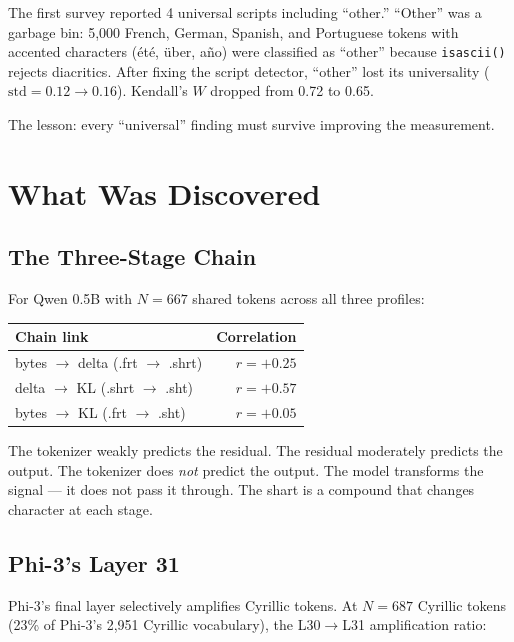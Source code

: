 \documentclass[11pt,a4paper]{article}
\begin{document}
The first survey reported 4 universal scripts including ``other.'' ``Other'' was a garbage bin: 5{,}000 French, German, Spanish, and Portuguese tokens with accented characters (\'et\'e, \"uber, a\~no) were classified as ``other'' because \texttt{isascii()} rejects diacritics. After fixing the script detector, ``other'' lost its universality ($\text{std} = 0.12 \to 0.16$). Kendall's $W$ dropped from 0.72 to 0.65.

The lesson: every ``universal'' finding must survive improving the measurement.

\section{What Was Discovered}

\subsection{The Three-Stage Chain}

For Qwen 0.5B with $N = 667$ shared tokens across all three profiles:

\begin{center}
\begin{tabular}{lr}
\toprule
\textbf{Chain link} & \textbf{Correlation} \\
\midrule
bytes $\to$ delta (.frt $\to$ .shrt) & $r = +0.25$ \\
delta $\to$ KL (.shrt $\to$ .sht) & $r = +0.57$ \\
bytes $\to$ KL (.frt $\to$ .sht) & $r = +0.05$ \\
\bottomrule
\end{tabular}
\end{center}

The tokenizer weakly predicts the residual. The residual moderately predicts the output. The tokenizer does \textit{not} predict the output. The model transforms the signal --- it does not pass it through. The shart is a compound that changes character at each stage.

\subsection{Phi-3's Layer 31}

Phi-3's final layer selectively amplifies Cyrillic tokens. At $N = 687$ Cyrillic tokens (23\% of Phi-3's 2{,}951 Cyrillic vocabulary), the L30$\to$L31 amplification ratio:
\end{document}
